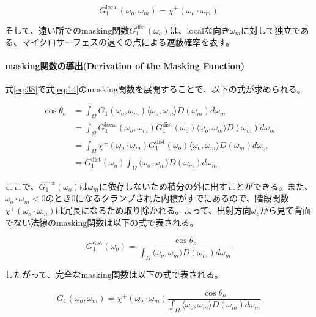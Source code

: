 \documentclass[a4j,xelatex,ja=standard]{bxjsarticle}
\begin{document}
\begin{equation}
    G_1^{\text{local}}(\omega_o, \omega_m) = \chi^+(\omega_o \cdot \omega_m)
    \label{eq:39}
\end{equation}

そして、遠い所でのmasking関数$G_1^{\text{dist}}(\omega_o)$は、localな向き$\omega_m$に対して独立である、マイクロサーフェスの遠くの点による遮蔽確率を表す。

\paragraph{masking関数の導出(Derivation of the Masking Function)}

式\eqref{eq:38}で式\eqref{eq:14}のmasking関数を展開することで、以下の式が求められる。

\begin{equation}
    \begin{split}
        \cos\theta_o
        &= \int_{\Omega} G_1(\omega_o, \omega_m) \langle \omega_o, \omega_m \rangle D(\omega_m) d\omega_m \\
        &= \int_{\Omega} G_1^{\text{local}}(\omega_o, \omega_m) G_1^{\text{dist}}(\omega_o) \langle \omega_o, \omega_m \rangle D(\omega_m) d\omega_m \\
        &= \int_{\Omega} \chi^+(\omega_o \cdot \omega_m) G_1^{\text{dist}}(\omega_o) \langle \omega_o, \omega_m \rangle D(\omega_m) d\omega_m \\
        &=  G_1^{\text{dist}}(\omega_o) \int_{\Omega} \langle \omega_o, \omega_m \rangle D(\omega_m) d\omega_m
    \end{split}
    \label{eq:40}
\end{equation}

ここで、$G_1^{\text{dist}}(\omega_o)$は$\omega_m$に依存しないため積分の外に出すことができる。また、$\omega_o \cdot \omega_m < 0$のとき$0$になるクランプされた内積がすでにあるので、階段関数$\chi^+(\omega_o \cdot \omega_m)$は冗長になるため取り除かれる。よって、出射方向$\omega_o$から見て背面でない法線のmasking関数は以下の式で表される。

\begin{equation}
    G_1^{\text{dist}}(\omega_o) = \frac{\cos\theta_o}{\int_{\Omega} \langle \omega_o, \omega_m \rangle D(\omega_m) d\omega_m}
    \label{eq:41}
\end{equation}

したがって、完全なmasking関数は以下の式で表される。

\begin{equation}
    \boxed{
    G_1(\omega_o, \omega_m) = \chi^+(\omega_o \cdot \omega_m) \frac{\cos\theta_o}{\int_{\Omega} \langle \omega_o, \omega_m \rangle D(\omega_m) d\omega_m}
    }
    \label{eq:42}
\end{equation}
\end{document}
